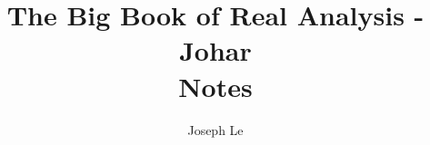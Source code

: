 \documentclass[10pt]{book}
\begin{document}
\title{The Big Book of Real Analysis - Johar \\
\large Notes}
\author{Joseph Le}
\date{}
\maketitle
\tableofcontents



\part{}\label{part:part1}


\part{}\label{part:part2}
\part{}\label{part:part3}
\end{document}

